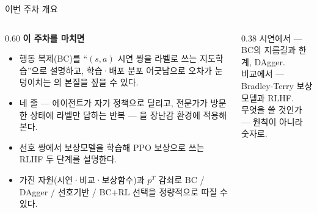 \begin{frame}{이번 주차 개요}
  \small
  \begin{columns}[T]
    \begin{column}{0.60\textwidth}
      \textbf{이 주차를 마치면}
      \begin{itemize}
        \item 행동 복제(BC)를 ``$(s,a)$ 시연 쌍을 라벨로 쓰는
          지도학습''으로 설명하고, 학습·배포 분포 어긋남으로
          오차가 눈덩이치는 의 본질을 짚을 수 있다.
        \item {} 네 줄 — 에이전트가 자기 정책으로 달리고,
          전문가가 방문한 상태에 라벨만 답하는 반복 — 을 장난감
          환경에 적용해 본다.
        \item {} 선호 쌍에서 보상모델을 학습해
          PPO 보상으로 쓰는 RLHF 두 단계를 설명한다.
        \item 가진 자원(시연·비교·보상함수)과 \small$p^T$
          \normalsize 감쇠로 BC / DAgger / 선호기반 / BC+RL 선택을
          정량적으로 따질 수 있다.
      \end{itemize}
    \end{column}
    \begin{column}{0.38\textwidth}
       시연에서 — BC의 지름길과 한계, DAgger. \\[0.5em]
       비교에서 — Bradley-Terry 보상모델과 RLHF. \\[0.5em]
       무엇을 쓸 것인가 — 원칙이 아니라 숫자로.
    \end{column}
  \end{columns}
\end{frame}
